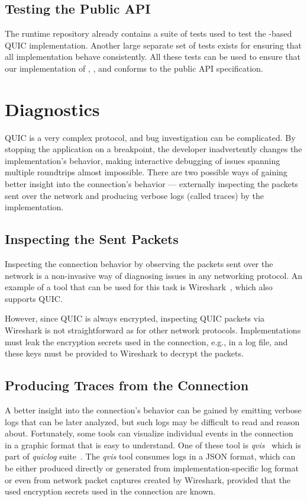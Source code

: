 \subsection{Testing the Public API}

The \dotnet{} runtime repository already contains a suite of tests used to test the
\libmsquic{}-based QUIC implementation. Another large separate set of tests exists for ensuring that
all  implementation behave consistently. All these tests can be used to ensure that
our implementation of \QuicListener{}, \QuicConnection{}, and \QuicStream{} conforms to the public
API specification.

\section{Diagnostics}

QUIC is a very complex protocol, and bug investigation can be complicated. By stopping the
application on a breakpoint, the developer inadvertently changes the implementation's behavior,
making interactive debugging of issues spanning multiple roundtrips almost impossible. There are two
possible ways of gaining better insight into the connection's behavior --- externally inspecting the
packets sent over the network and producing verbose logs (called traces) by the implementation.

\subsection{Inspecting the Sent Packets}

Inspecting the connection behavior by observing the packets sent over the network is a non-invasive
way of diagnosing issues in any networking protocol. An example of a tool that can be used for this
task is Wireshark~\cite{web:wireshark}, which also supports QUIC\@.

However, since QUIC is always encrypted, inspecting QUIC packets via Wireshark is not
straightforward as for other network protocols. Implementations must leak the encryption secrets
used in the connection, e.g., in a log file, and these keys must be provided to Wireshark to decrypt
the packets.

\subsection{Producing Traces from the Connection}

A better insight into the connection's behavior can be gained by emitting verbose logs that can be
later analyzed, but such logs may be difficult to read and reason about. Fortunately, some tools can
visualize individual events in the connection in a graphic format that is easy to understand. One of
these tool is \textit{qvis}~\cite{web:qvis} which is part of \textit{quiclog}
suite~\cite{githubquiclog}. The \textit{qvis} tool consumes logs in a JSON format, which can be
either produced directly or generated from implementation-specific log format or even from network
packet captures created by Wireshark, provided that the used encryption secrets used in the
connection are known.

